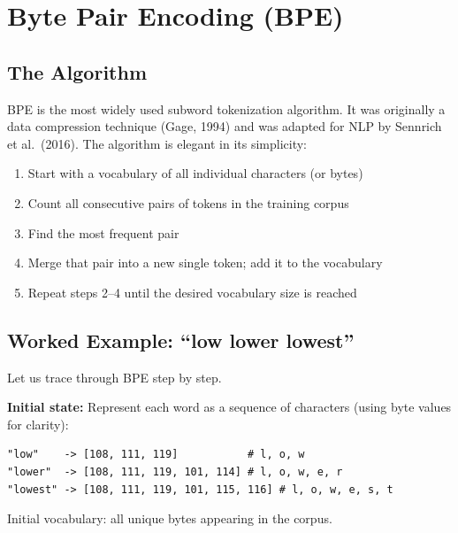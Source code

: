 \documentclass[11pt,a4paper]{article}
\begin{document}
\section{Byte Pair Encoding (BPE)}

\subsection{The Algorithm}

BPE is the most widely used subword tokenization algorithm. It was originally a data compression technique (Gage, 1994) and was adapted for NLP by Sennrich et al.\ (2016). The algorithm is elegant in its simplicity:

\begin{tcolorbox}[colback=white, colframe=alfaisalgreen, boxrule=0.5pt, title={\textbf{BPE Algorithm}}]
\begin{enumerate}[leftmargin=1.5em]
    \item Start with a vocabulary of all individual characters (or bytes)
    \item Count all consecutive pairs of tokens in the training corpus
    \item Find the most frequent pair
    \item Merge that pair into a new single token; add it to the vocabulary
    \item Repeat steps 2--4 until the desired vocabulary size is reached
\end{enumerate}
\end{tcolorbox}

\subsection{Worked Example: ``low lower lowest''}

Let us trace through BPE step by step.

\medskip\noindent\textbf{Initial state:} Represent each word as a sequence of characters (using byte values for clarity):

\begin{lstlisting}
"low"    -> [108, 111, 119]           # l, o, w
"lower"  -> [108, 111, 119, 101, 114] # l, o, w, e, r
"lowest" -> [108, 111, 119, 101, 115, 116] # l, o, w, e, s, t
\end{lstlisting}

Initial vocabulary: all unique bytes appearing in the corpus.
\end{document}

